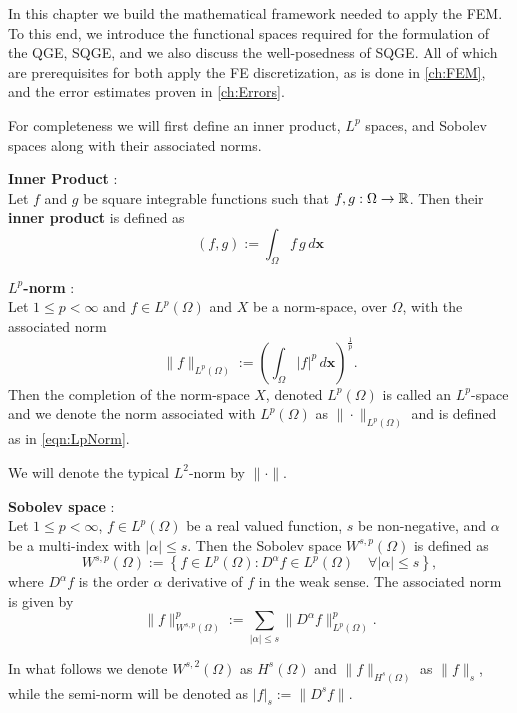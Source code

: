 In this chapter we build the mathematical framework needed to apply the FEM. To
this end, we introduce the functional spaces required for the formulation of the
QGE, SQGE, and we also discuss the well-posedness of SQGE. All of which are
prerequisites for both apply the FE discretization, as is done in
\autoref{ch:FEM}, and the error estimates proven in \autoref{ch:Errors}.

For completeness we will first define an inner product, $L^p$ spaces, and
Sobolev spaces along with their associated norms.

\begin{definition} \label{def:InnerProduct}
  \textbf{Inner Product} \cite{Kreyszig1989}: \\
  Let $f$ and $g$ be square integrable functions such that $f,g : \Omega
  \rightarrow \mathbb{R}$.  Then their \textbf{inner product} is defined as
  \begin{equation}
    (f,g) := \int_{\Omega}\! f \, g\, d\mathbf{x}
    \label{eqn:InnerProduct}
  \end{equation}
\end{definition}

\begin{definition} \label{def:LpNorm}
  \textbf{$L^p$-norm} \cite{Kreyszig1989}: \\
  Let $1\le p < \infty$ and $f \in L^p(\Omega)$ and $X$ be a norm-space, over
  $\Omega$, with the associated norm
  \begin{equation}
    \|f\|_{L^p(\Omega)} := \left(\int_{\Omega}\! |f|^p\, d\mathbf{x}\right)^{\frac{1}{p}}.
    \label{eqn:LpNorm}
  \end{equation}
  Then the completion of the norm-space $X$, denoted $L^p(\Omega)$ is called an
  $L^p$-space and we denote the norm associated with $L^p(\Omega)$ as
  $\|\cdot\|_{L^p(\Omega)}$ and is defined as in \eqref{eqn:LpNorm}.
\end{definition}
We will denote the typical $L^2$-norm by $\|\cdot\|$.

\begin{definition} \label{SobolevSpace}
  \textbf{Sobolev space} \cite{Evans1989}: \\
  Let $1\le p < \infty$, $f \in L^p(\Omega)$ be a real valued function, $s$ be
  non-negative, and $\alpha$ be a multi-index with $|\alpha| \le s$. Then the
  Sobolev space $W^{s,p}(\Omega)$ is defined as
  \begin{equation}
    W^{s,p}(\Omega) := \left\{ f\in L^p(\Omega) : D^{\alpha} f \in
      L^p(\Omega)\quad \forall |\alpha| \le s\right\},
    \label{eqn:Sobolev}
  \end{equation}
  where $D^{\alpha}f$ is the order $\alpha$ derivative of $f$ in the weak sense.
  The associated norm is given by
  \begin{equation}
    \|f\|_{W^{s,p}(\Omega)}^p := \sum_{|\alpha|\le s}
      \|D^{\alpha}f\|_{L^p(\Omega)}^p.
    \label{eqn:HkpNorm}
  \end{equation}
\end{definition}
In what follows we denote $W^{s,2}(\Omega)$ as $H^s(\Omega)$ and
$\|f\|_{H^s(\Omega)}$ as $\|f\|_s$, while the semi-norm will be denoted
as $|f|_s := \|D^s f\|$.
